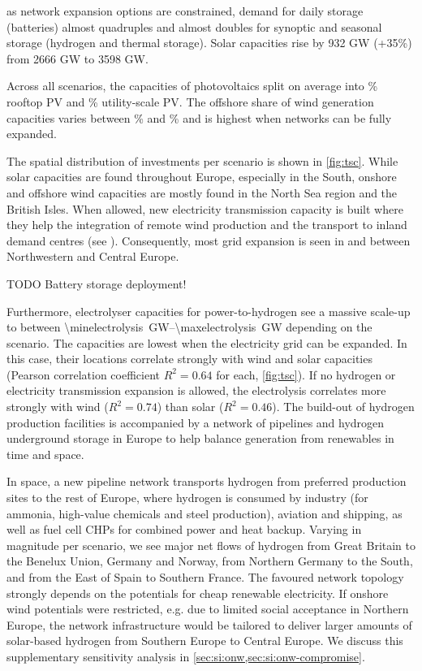 as network expansion options are constrained, demand for daily storage
(batteries) almost quadruples and almost doubles for synoptic and seasonal
storage (hydrogen and thermal storage). Solar capacities rise by 932 GW (+35\%)
from 2666 GW to 3598 GW.

Across
all scenarios, the capacities of photovoltaics split on average into
\meanrooftopshare\% rooftop PV and \meanutilityshare\% utility-scale PV. The
offshore share of wind generation capacities varies between \minoffshoreshare\%
and \maxoffshoreshare\% and is highest when networks can be fully
expanded.

The spatial distribution of investments per scenario is shown in \cref{fig:tsc}.
While solar capacities are found throughout Europe, especially in the South,
onshore and offshore wind capacities are mostly found in the North Sea region
and the British Isles. When allowed, new electricity transmission capacity is
built where they help the integration of remote wind production and the
transport to inland demand centres (see ). Consequently, most
grid expansion is seen in and between Northwestern and Central Europe.

TODO Battery storage deployment!

Furthermore, electrolyser capacities for power-to-hydrogen see a massive
scale-up to between \SIrange{\minelectrolysis}{\maxelectrolysis}{\giga\watt}
depending on the scenario. The capacities are lowest when the electricity grid
can be expanded. In this case, their locations correlate strongly with wind and
solar capacities (Pearson correlation coefficient $R^2=0.64$ for each,
\cref{fig:tsc}). If no hydrogen or electricity transmission expansion is
allowed, the electrolysis correlates more strongly with wind ($R^2=0.74$) than
solar ($R^2=0.46$). The build-out of hydrogen production facilities is
accompanied by a network of pipelines and hydrogen underground storage in Europe
to help balance generation from renewables in time and space.

In space, a new pipeline network transports hydrogen from preferred production
sites to the rest of Europe, where hydrogen is consumed by industry (for
ammonia, high-value chemicals and steel production), aviation and shipping, as
well as fuel cell CHPs for combined power and heat backup. Varying in magnitude
per scenario, we see major net flows of hydrogen from Great Britain to the
Benelux Union, Germany and Norway, from Northern Germany to the South, and from
the East of Spain to Southern France. The favoured network topology strongly
depends on the potentials for cheap renewable electricity. If onshore wind
potentials were restricted, e.g. due to limited social acceptance in Northern
Europe, the network infrastructure would be tailored to deliver larger amounts
of solar-based hydrogen from Southern Europe to Central Europe. We discuss this
supplementary sensitivity analysis in \cref{sec:si:onw,sec:si:onw-compromise}.


